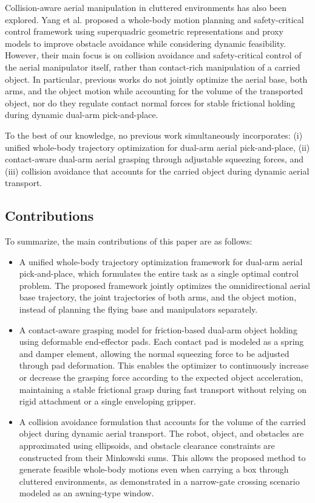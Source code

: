 \documentclass[letterpaper, 10 pt, conference]{ieeeconf}  %
\begin{document}
Collision-aware aerial manipulation in cluttered environments has also been explored. Yang et al. \cite{yang2025whole} proposed a whole-body motion planning and safety-critical control framework using superquadric geometric representations and proxy models to improve obstacle avoidance while considering dynamic feasibility. However, their main focus is on collision avoidance and safety-critical control of the aerial manipulator itself, rather than contact-rich manipulation of a carried object. In particular, previous works do not jointly optimize the aerial base, both arms, and the object motion while accounting for the volume of the transported object, nor do they regulate contact normal forces for stable frictional holding during dynamic dual-arm pick-and-place.
\par
To the best of our knowledge, no previous work simultaneously incorporates: (i) unified whole-body trajectory optimization for dual-arm aerial pick-and-place, (ii) contact-aware dual-arm aerial grasping through adjustable squeezing forces, and (iii) collision avoidance that accounts for the carried object during dynamic aerial transport.

\subsection{Contributions}
To summarize, the main contributions of this paper are as follows:
\begin{itemize}
    \item A unified whole-body trajectory optimization framework for dual-arm aerial pick-and-place, which formulates the entire task as a single optimal control problem. The proposed framework jointly optimizes the omnidirectional aerial base trajectory, the joint trajectories of both arms, and the object motion, instead of planning the flying base and manipulators separately.

    \item A contact-aware grasping model for friction-based dual-arm object holding using deformable end-effector pads. Each contact pad is modeled as a spring and damper element, allowing the normal squeezing force to be adjusted through pad deformation. This enables the optimizer to continuously increase or decrease the grasping force according to the expected object acceleration, maintaining a stable frictional grasp during fast transport without relying on rigid attachment or a single enveloping gripper.

    \item A collision avoidance formulation that accounts for the volume of the carried object during dynamic aerial transport. The robot, object, and obstacles are approximated using ellipsoids, and obstacle clearance constraints are constructed from their Minkowski sums. This allows the proposed method to generate feasible whole-body motions even when carrying a box through cluttered environments, as demonstrated in a narrow-gate crossing scenario modeled as an awning-type window.
\end{itemize}
\end{document}
